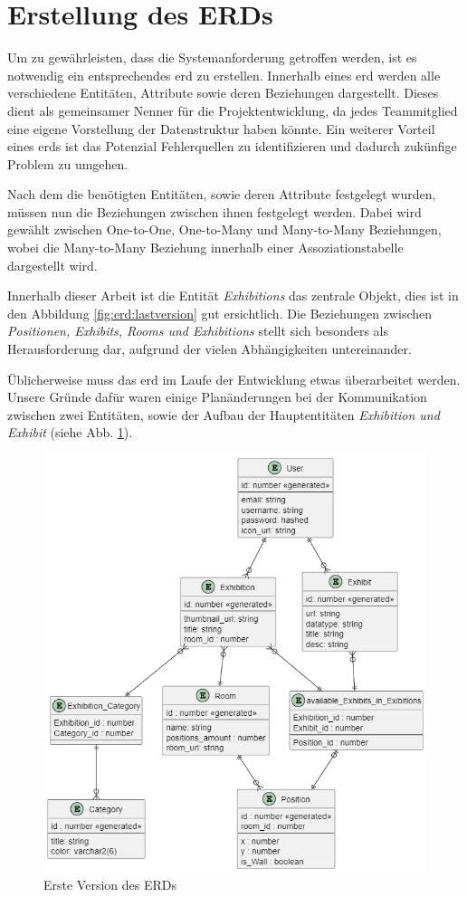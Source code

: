 \section{Erstellung des ERDs}
Um zu gewährleisten, dass die Systemanforderung getroffen werden, ist es notwendig ein entsprechendes \gls{erd} zu erstellen.
Innerhalb eines \gls{erd} werden alle verschiedene Entitäten, Attribute sowie deren Beziehungen dargestellt.
Dieses dient als gemeinsamer Nenner für die Projektentwicklung, da jedes Teammitglied eine eigene Vorstellung der Datenstruktur haben könnte. 
Ein weiterer Vorteil eines \gls{erd}s ist das Potenzial Fehlerquellen zu identifizieren und dadurch zukünfige Problem zu umgehen. 

Nach dem die benötigten Entitäten, sowie deren Attribute festgelegt wurden, müssen nun die Beziehungen zwischen ihnen festgelegt werden. 
Dabei wird gewählt zwischen One-to-One, One-to-Many und Many-to-Many Beziehungen, wobei die Many-to-Many Beziehung innerhalb einer Assoziationstabelle dargestellt wird. 

Innerhalb dieser Arbeit ist die Entität \emph{Exhibitions} das zentrale Objekt, dies ist in den Abbildung \ref{fig:erd:lastversion} gut ersichtlich.
Die Beziehungen zwischen \emph{Positionen, Exhibits, Rooms und Exhibitions} stellt sich besonders als Herausforderung dar, aufgrund der vielen Abhängigkeiten untereinander. 

Üblicherweise muss das \gls{erd} im Laufe der Entwicklung etwas überarbeitet werden. 
Unsere Gründe dafür waren einige Planänderungen bei der Kommunikation zwischen zwei Entitäten, sowie der Aufbau der Hauptentitäten \emph{Exhibition und Exhibit} (siehe Abb. \ref{fig:erd:firstversion}).

 
\begin{figure}
    \centering
    \includegraphics[scale=0.5]{pics/firstversion_erd.png}
    \caption{Erste Version des ERDs}
    \label{fig:erd:firstversion}
\end{figure}

